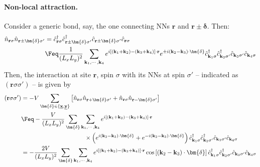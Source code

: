 \paragraph{Non-local attraction.} Consider a generic bond, say, the one connecting NNs $\mathbf{r}$ and $\mathbf{r}\pm\bm{\delta}$. 
Then:
\[
\begin{aligned}
	\hat n_{\mathbf{r}\sigma} \hat n_{\mathbf{r} \pm \bm{\delta} \sigma'} &= \hat c_{\mathbf{r}\sigma}^\dagger \hat c_{\mathbf{r} \pm \bm{\delta} \sigma'}^\dagger \hat c_{\mathbf{r} \pm \bm{\delta} \sigma'} \hat c_{\mathbf{r}\sigma} \\
	&\Feq \frac{1}{(L_xL_y)^2} \sum_{\mathbf{k}_1,\cdots,\mathbf{k}_4}
	e^{i \left[ (\mathbf{k}_1 + \mathbf{k}_2) - (\mathbf{k}_3 + \mathbf{k}_4) \right] \cdot \mathbf{r}} e^{\pm i(\mathbf{k}_2-\mathbf{k}_3) \cdot \bm{\delta}}  \hat c_{\mathbf{k}_1 \sigma}^\dagger \hat c_{\mathbf{k}_2 \sigma'}^\dagger \hat c_{\mathbf{k}_3 \sigma'} \hat c_{\mathbf{k}_4\sigma}
\end{aligned}
\]
Then, the interaction at site $\mathbf{r}$, spin $\sigma$ with its NNs at spin $\sigma'$ -- indicated as $(\mathbf{r}\sigma\sigma')$ -- is given by
\[
\begin{aligned}
	(\mathbf{r}\sigma\sigma') &= -V \sum_{\bm{\delta}\in \lbrace \underline{\mathbf{x}}, \underline{\mathbf{y}} \rbrace} 
	\left[
		\hat n_{\mathbf{r}\sigma} \hat n_{\mathbf{r} + \bm{\delta} \sigma'} + \hat n_{\mathbf{r}\sigma} \hat n_{\mathbf{r} - \bm{\delta} \sigma'}
	\right] \\
	&\Feq -\frac{V}{(L_xL_y)^2} \sum_{\bm{\delta}} \sum_{\mathbf{k}_1,\cdots,\mathbf{k}_4} e^{i \left[ (\mathbf{k}_1 + \mathbf{k}_2) - (\mathbf{k}_3 + \mathbf{k}_4) \right] \cdot \mathbf{r}} \\
	&\hspace{0.3\textwidth} \times \left(
	e^{ i(\mathbf{k}_2-\mathbf{k}_3) \cdot \bm{\delta}} + e^{ -i(\mathbf{k}_2-\mathbf{k}_3) \cdot \bm{\delta}}
	\right)
	\hat c_{\mathbf{k}_1 \sigma}^\dagger \hat c_{\mathbf{k}_2 \sigma'}^\dagger \hat c_{\mathbf{k}_3 \sigma'} \hat c_{\mathbf{k}_4\sigma} \\
	&= -\frac{2V}{(L_xL_y)^2} \sum_{\bm{\delta}} \sum_{\mathbf{k}_1,\cdots,\mathbf{k}_4} e^{i \left[ (\mathbf{k}_1 + \mathbf{k}_2) - (\mathbf{k}_3 + \mathbf{k}_4) \right] \cdot \mathbf{r}} \cos\left[
	(\mathbf{k}_2-\mathbf{k}_3) \cdot \bm{\delta}
	\right]	\hat c_{\mathbf{k}_1 \sigma}^\dagger \hat c_{\mathbf{k}_2 \sigma'}^\dagger \hat c_{\mathbf{k}_3 \sigma'} \hat c_{\mathbf{k}_4\sigma}
\end{aligned}
\]
